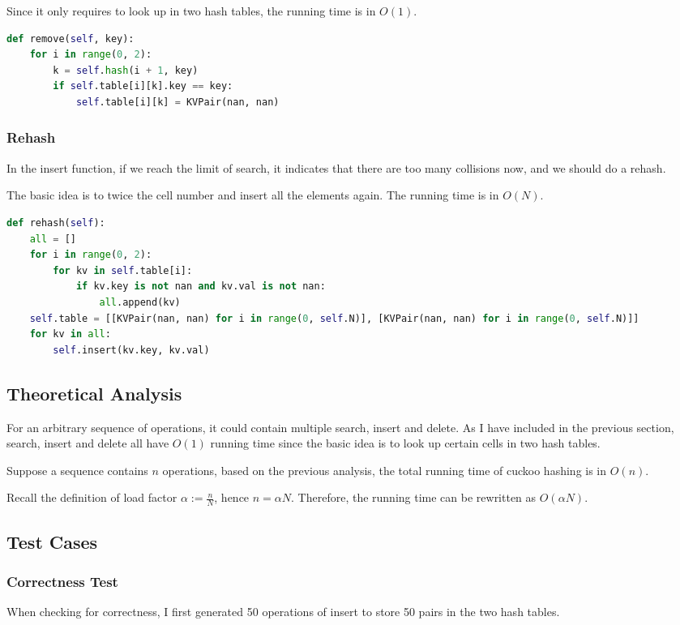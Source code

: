 \documentclass{article}
\begin{document}
\begin{spacing}{1.2}
Since it only requires to look up in two hash tables, the running time is in $O(1)$.
\begin{lstlisting}[language=Python]
def remove(self, key):
    for i in range(0, 2):
        k = self.hash(i + 1, key)
        if self.table[i][k].key == key:
            self.table[i][k] = KVPair(nan, nan)
\end{lstlisting}

\subsubsection{Rehash}
In the insert function, if we reach the limit of search, it indicates that there are too many collisions now, and we should do a rehash.

The basic idea is to twice the cell number and insert all the elements again. The running time is in $O(N)$.
\begin{lstlisting}[language=Python]
def rehash(self):
    all = []
    for i in range(0, 2):
        for kv in self.table[i]:
            if kv.key is not nan and kv.val is not nan:
                all.append(kv)
    self.table = [[KVPair(nan, nan) for i in range(0, self.N)], [KVPair(nan, nan) for i in range(0, self.N)]]
    for kv in all:
        self.insert(kv.key, kv.val)
\end{lstlisting}

\subsection{Theoretical Analysis}
For an arbitrary sequence of operations, it could contain multiple search, insert and delete. As I have included in the previous section, search, insert and delete all have $O(1)$ running time since the basic idea is to look up certain cells in two hash tables.

Suppose a sequence contains $n$ operations, based on the previous analysis, the total running time of cuckoo hashing is in $O(n)$.

Recall the definition of load factor $\alpha:=\frac{n}{N}$, hence $n=\alpha N$. Therefore, the running time can be rewritten as $O(\alpha N)$.
\subsection{Test Cases}
\subsubsection{Correctness Test}
When checking for correctness, I first generated 50 operations of insert to store 50 pairs in the two hash tables.


\end{spacing}
\end{document}
